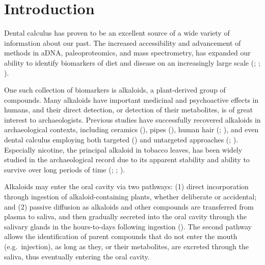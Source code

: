 \documentclass[
  11pt,
  leqno]{scrartcl}
\title{}
\author{}
\date{}
\begin{document}


\section{Introduction}\label{introduction}

Dental calculus has proven to be an excellent source of a wide variety
of information about our past. The increased accessibility and
advancement of methods in aDNA, paleoproteomics, and mass spectrometry,
has expanded our ability to identify biomarkers of diet and disease on
an increasingly large scale
(; ;
).

One such collection of biomarkers is alkaloids, a plant-derived group of
compounds. Many alkaloids have important medicinal and psychoactive
effects in humans, and their direct detection, or detection of their
metabolites, is of great interest to archaeologists. Previous studies
have successfully recovered alkaloids in archaeological contexts,
including ceramics (), pipes (), human hair
(; ), and even dental calculus employing both targeted
() and
untargeted approaches (;
). Especially nicotine, the principal alkaloid in tobacco leaves,
has been widely studied in the archaeological record due to its apparent
stability and ability to survive over long periods of time
(;
;
).

Alkaloids may enter the oral cavity via two pathways: (1) direct
incorporation through ingestion of alkaloid-containing plants, whether
deliberate or accidental; and (2) passive diffusion as alkaloids and
other compounds are transferred from plasma to saliva, and then
gradually secreted into the oral cavity through the salivary glands in
the hours-to-days following ingestion
(). The
second pathway allows the identification of parent compounds that do not
enter the mouth (e.g.~injection), as long as they, or their metabolites,
are excreted through the saliva, thus eventually entering the oral
cavity.
\end{document}
